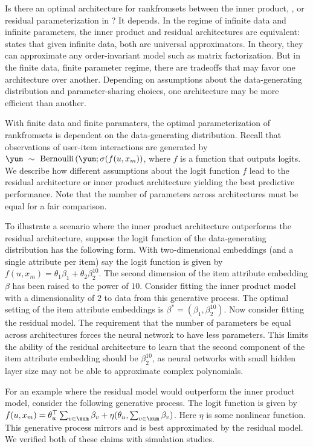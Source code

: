 Is there an optimal architecture for \acrshort{rankfromsets} between the inner
product, , or residual parameterization in
? It depends. In the regime of infinite data and infinite
parameters, the inner product and residual architectures are equivalent:
 states that given infinite data, both are universal approximators.
In theory, they can approximate any order-invariant model such as matrix
factorization. But in the finite data, finite parameter regime, there are
tradeoffs that may favor one architecture over another. Depending on assumptions
about the data-generating distribution and parameter-sharing choices, one
architecture may be more efficient than another.

With finite data and finite paramaters, the optimal parameterization of
\acrshort{rankfromsets} is dependent on the data-generating distribution. Recall
that observations of user-item interactions are generated by
$ \yum~\sim~\textrm{Bernoulli}\left(\yum; \sigma(f(u, x_m)\right)$, where $f$ is
a function that outputs logits. We describe how different assumptions about the
logit function $f$ lead to the residual architecture or inner product
architecture yielding the best predictive performance. Note that the number of
parameters across architectures must be equal for a fair comparison.

To illustrate a scenario where the inner product architecture outperforms the
residual architecture, suppose the logit function of the data-generating
distribution has the following form. With two-dimensional embeddings (and a
single attribute per item) say the logit function is given by
$f(u, x_m) = \theta_1\beta_1 + \theta_2\beta_2^{10}$. The second dimension of
the item attribute embedding $\beta$ has been raised to the power of $10$.
Consider fitting the inner product model with a dimensionality of $2$ to data
from this generative process. The optimal setting of the item attribute
embeddings is $\beta^* = (\beta_1, \beta_2^{10})$. Now consider fitting the
residual model. The requirement that the number of parameters be equal across
architectures forces the neural network to have less parameters. This limits the
ability of the residual architecture to learn that the second component of the
item attribute embedding should be $\beta_2^{10}$, as neural networks with small
hidden layer size may not be able to approximate complex polynomials. 

For an example where the residual model would outperform the inner product
model, consider the following generative process. The logit function is given by
$f(u, x_m) = \theta_u^\top \sum_{v\in \xum}\beta_v + \eta(\theta_u, \sum_{v\in
  \xum} \beta_v)$. Here $\eta$ is some nonlinear function. This generative
process mirrors  and is best approximated by the residual
model. We verified both of these claims with simulation studies.

